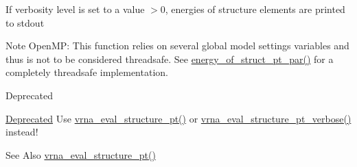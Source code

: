 If verbosity level is set to a value $>$0, energies of structure elements are printed to stdout

\begin{DoxyNote}{Note}
Open\-M\-P\-: This function relies on several global model settings variables and thus is not to be considered threadsafe. See \hyperlink{group__eval_ga49acb3d5627dc6823a7ce12d116d4c69}{energy\-\_\-of\-\_\-struct\-\_\-pt\-\_\-par()} for a completely threadsafe implementation.
\end{DoxyNote}
\begin{DoxyRefDesc}{Deprecated}
\item[\hyperlink{deprecated__deprecated000053}{Deprecated}]Use \hyperlink{group__eval_gadbd09372ddfd7a450bbd590c96a6bfe4}{vrna\-\_\-eval\-\_\-structure\-\_\-pt()} or \hyperlink{group__eval_ga8a517cfeeae8c376ae7b1e0c401d38b4}{vrna\-\_\-eval\-\_\-structure\-\_\-pt\-\_\-verbose()} instead!\end{DoxyRefDesc}


\begin{DoxySeeAlso}{See Also}
\hyperlink{group__eval_gadbd09372ddfd7a450bbd590c96a6bfe4}{vrna\-\_\-eval\-\_\-structure\-\_\-pt()}
\end{DoxySeeAlso}

